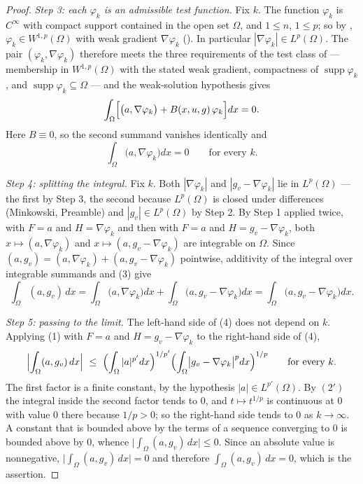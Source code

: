 \begin{proof}
\emph{Step 3: each $\varphi_k$ is an admissible test function.}  Fix $k$.  The
function $\varphi_k$ is $C^\infty$ with compact support contained in the open
set $\Omega$, and $1\le n$, $1\le p$; so by
, $\varphi_k\in W^{1,p}(\Omega)$ with weak
gradient $\nabla\varphi_k$ ().  In particular
$|\nabla\varphi_k|\in L^{p}(\Omega)$.  The pair
$(\varphi_k,\nabla\varphi_k)$ therefore meets the three requirements of the test
class of  --- membership in $W^{1,p}(\Omega)$ with the
stated weak gradient, compactness of $\operatorname{supp}\varphi_k$, and
$\operatorname{supp}\varphi_k\subseteq\Omega$ --- and the weak-solution
hypothesis gives
\[
\int_\Omega\Bigl[\bigl(a,\nabla\varphi_k\bigr)+B(x,u,g)\,\varphi_k\Bigr]dx=0 .
\]
Here $B\equiv0$, so the second summand vanishes identically and
\[
\int_\Omega\bigl(a,\nabla\varphi_k\bigr)dx=0
\qquad\text{for every }k .
\tag{3}
\]

\emph{Step 4: splitting the integral.}  Fix $k$.  Both $|\nabla\varphi_k|$ and
$|g_v-\nabla\varphi_k|$ lie in $L^{p}(\Omega)$ --- the first by Step 3, the
second because $L^p(\Omega)$ is closed under differences (Minkowski, Preamble)
and $|g_v|\in L^p(\Omega)$ by Step 2.  By Step 1 applied twice, with $F=a$ and
$H=\nabla\varphi_k$ and then with $F=a$ and $H=g_v-\nabla\varphi_k$, both
$x\mapsto(a,\nabla\varphi_k)$ and $x\mapsto(a,g_v-\nabla\varphi_k)$ are
integrable on $\Omega$.  Since
$(a,g_v)=(a,\nabla\varphi_k)+(a,g_v-\nabla\varphi_k)$ pointwise, additivity of
the integral over integrable summands and (3) give
\[
\int_\Omega(a,g_v)\,dx
=\int_\Omega\bigl(a,\nabla\varphi_k\bigr)dx
+\int_\Omega\bigl(a,g_v-\nabla\varphi_k\bigr)dx
=\int_\Omega\bigl(a,g_v-\nabla\varphi_k\bigr)dx .
\tag{4}
\]

\emph{Step 5: passing to the limit.}  The left-hand side of (4) does not depend
on $k$.  Applying (1) with $F=a$ and $H=g_v-\nabla\varphi_k$ to the right-hand
side of (4),
\[
\Bigl|\int_\Omega(a,g_v)\,dx\Bigr|
\ \le\ \Bigl(\int_\Omega|a|^{p'}dx\Bigr)^{1/p'}
\Bigl(\int_\Omega\bigl|g_v-\nabla\varphi_k\bigr|^{p}dx\Bigr)^{1/p}
\qquad\text{for every }k .
\]
The first factor is a finite constant, by the hypothesis $|a|\in L^{p'}(\Omega)$.
By $(2')$ the integral inside the second factor tends to $0$, and $t\mapsto
t^{1/p}$ is continuous at $0$ with value $0$ there because $1/p>0$; so the
right-hand side tends to $0$ as $k\to\infty$.  A constant that is bounded above
by the terms of a sequence converging to $0$ is bounded above by $0$, whence
$\bigl|\int_\Omega(a,g_v)\,dx\bigr|\le0$.  Since an absolute value is
nonnegative, $\bigl|\int_\Omega(a,g_v)\,dx\bigr|=0$ and therefore
$\int_\Omega(a,g_v)\,dx=0$, which is the assertion.
\end{proof}
